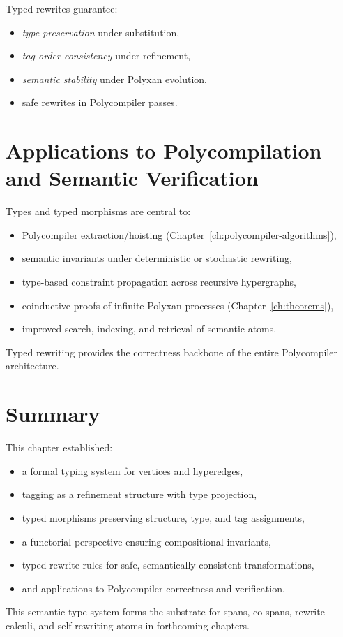 Typed rewrites guarantee:
\begin{itemize}
\item \emph{type preservation} under substitution,
\item \emph{tag-order consistency} under refinement,
\item \emph{semantic stability} under Polyxan evolution,
\item safe rewrites in Polycompiler passes.
\end{itemize}

\section{Applications to Polycompilation and Semantic Verification}

Types and typed morphisms are central to:

\begin{itemize}
\item Polycompiler extraction/hoisting (Chapter~\ref{ch:polycompiler-algorithms}),
\item semantic invariants under deterministic or stochastic rewriting,
\item type-based constraint propagation across recursive hypergraphs,
\item coinductive proofs of infinite Polyxan processes (Chapter~\ref{ch:theorems}),
\item improved search, indexing, and retrieval of semantic atoms.
\end{itemize}

Typed rewriting provides the correctness backbone of the entire Polycompiler architecture.

\section{Summary}

This chapter established:

\begin{itemize}
\item a formal typing system for vertices and hyperedges,
\item tagging as a refinement structure with type projection,
\item typed morphisms preserving structure, type, and tag assignments,
\item a functorial perspective ensuring compositional invariants,
\item typed rewrite rules for safe, semantically consistent transformations,
\item and applications to Polycompiler correctness and verification.
\end{itemize}

This semantic type system forms the substrate for spans, co-spans, rewrite calculi, and self-rewriting atoms in forthcoming chapters.
